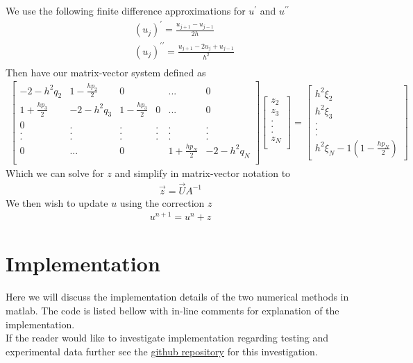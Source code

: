\documentclass{article}
\begin{document}
\begin{enumerate}
We use the following finite difference approximations for $u^\prime$ and $u^{\prime\prime}$
\begin{align}
&(u_j)^\prime = \frac{u_{j+1} - u_{j-1}}{2h} \\
&(u_j)^{\prime\prime} = \frac{u_{j+1} - 2u_{j} + u_{j-1}}{h^2} \\
\end{align}
Then have our matrix-vector system defined as
\begin{align}
\begin{bmatrix}
-2 - h^2q_2 & 1- \frac{hp_2}{2} & 0 & &... & 0 \\
1 + \frac{hp_3}{2} & -2 - h^2q_3 & 1 - \frac{hp_3}{2} & 0 &...& 0\\
0 & . & . & . & . & .\\
. & . & . & . & . & .\\
. & . & . & . & . & .\\
0 & ... &0 & & 1 + \frac{hp_N}{2} & -2 - h^2q_N \\
\end{bmatrix}
\begin{bmatrix}
z_2 \\ z_3 \\ . \\ . \\ . \\ z_N\\
\end{bmatrix}
=
\begin{bmatrix}
h^2 \xi_2 \\
h^2 \xi_3 \\
. \\
. \\
. \\
h^2 \xi_N - 1(1-\frac{hp_N}{2})
\end{bmatrix}
\end{align}
Which we can solve for $z$ and simplify in matrix-vector notation to
\begin{align}
\vec{z} = \vec{U} A^{-1} 
\end{align}
We then wish to update $u$ using the correction $z$
\begin{align}
u^{n + 1} = u^{n} + z
\end{align}
\end{enumerate}
\section{Implementation}
Here we will discuss the implementation details of the two numerical methods in matlab. The code is listed bellow with in-line comments for explanation of the implementation.  \\
If the reader would like to investigate implementation regarding testing and experimental data further see the \href{https://github.com/Liam-Watson/3AN-Vortex-Solutions}{ github repository} for this investigation.
\end{document}
